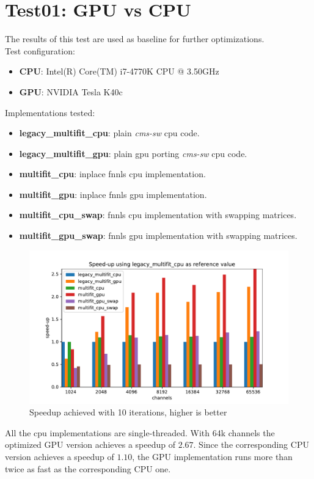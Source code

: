 \section{Test01: GPU vs CPU}
The results of this test are used as baseline for further optimizations. \\
Test configuration:
\begin{itemize}
  \item \textbf{CPU}: Intel(R) Core(TM) i7-4770K CPU @ 3.50GHz 
  \item \textbf{GPU}: NVIDIA Tesla K40c 
\end{itemize}
Implementations tested:
\begin{itemize}
  \item \textbf{legacy\_multifit\_cpu}: plain \textit{cms-sw} cpu code.
  \item \textbf{legacy\_multifit\_gpu}: plain gpu porting \textit{cms-sw} cpu code.
  \item \textbf{multifit\_cpu}: inplace fnnls cpu implementation.
  \item \textbf{multifit\_gpu}: inplace fnnls gpu implementation.
  \item \textbf{multifit\_cpu\_swap}: fnnls cpu implementation with swapping matrices.
  \item \textbf{multifit\_gpu\_swap}: fnnls gpu implementation with swapping matrices.
\end{itemize}
\begin{figure}[h]
  \includegraphics[width=\textwidth]{img/speedup}
  \caption{Speedup achieved with 10 iterations, higher is better}
  \label{img:speedup01}
\end{figure}
All the cpu implementations are single-threaded. With 64k channels the optimized GPU version achieves a speedup of $2.67$. Since the corresponding CPU version achieves a speedup of $1.10$, the GPU implementation runs more than twice as fast as the corresponding CPU one.
